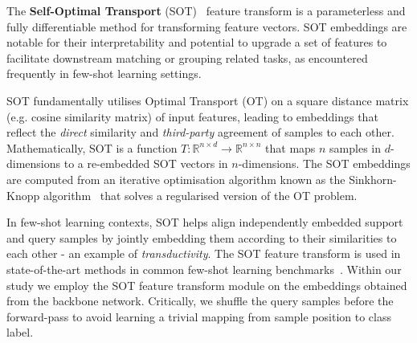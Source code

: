 
The \textbf{Self-Optimal Transport} (SOT)~\cite{sot} feature transform is a parameterless and fully differentiable method for transforming feature vectors. SOT embeddings are notable for their interpretability and potential to upgrade a set of features to facilitate  downstream matching or grouping related tasks, as encountered frequently in few-shot learning settings.

SOT fundamentally utilises Optimal Transport (OT) on a square distance matrix (e.g. cosine similarity matrix) of input features, 
leading to embeddings that reflect the \textit{direct} similarity and \textit{third-party} agreement of samples to each other. 
Mathematically, SOT is a function \(T: \mathbb{R}^{n \times d} \rightarrow \mathbb{R}^{n \times n}\) that maps \(n\) samples in \(d\)-dimensions to a 
re-embedded SOT vectors in \(n\)-dimensions. The SOT embeddings are computed from an iterative optimisation algorithm known as the Sinkhorn-Knopp 
algorithm~\cite{sinkhorn-knopp} that solves a regularised version of the OT problem.

In few-shot learning contexts, SOT helps align independently embedded support and query samples by jointly embedding them according to their similarities to each other - an example of \textit{transductivity}. 
The SOT feature transform is used in state-of-the-art methods in common few-shot learning benchmarks~\cite{sot}. Within our study we employ the SOT feature transform module on the embeddings obtained from the backbone network. Critically, we shuffle the query samples before the forward-pass to avoid learning a trivial mapping from sample position to class label.